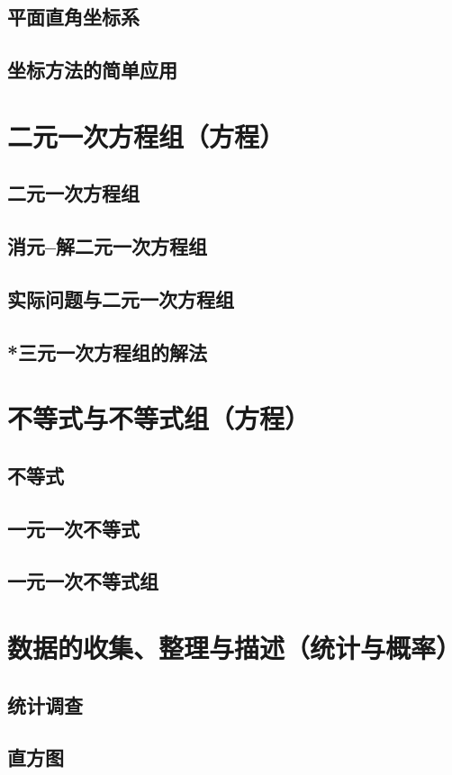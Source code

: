 \documentclass[cn,blue,10pt]{elegantbook}
\begin{document}
\section{平面直角坐标系}
\section{坐标方法的简单应用}
\chapter{二元一次方程组（方程）}
\section{二元一次方程组}
\section{消元--解二元一次方程组}
\section{实际问题与二元一次方程组}
\section{*三元一次方程组的解法}
\chapter{不等式与不等式组（方程）}
\section{不等式}
\section{一元一次不等式}
\section{一元一次不等式组}
\chapter{数据的收集、整理与描述（统计与概率）}
\section{统计调查}
\section{直方图}
\end{document}
